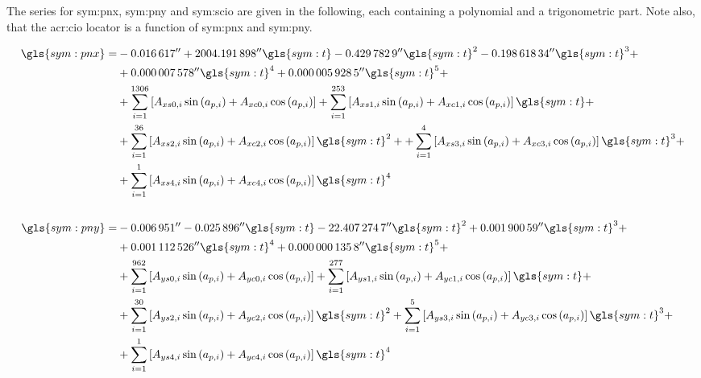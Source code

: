 The series for \gls{sym:pnx}, \gls{sym:pny} and \gls{sym:scio} are given in the following, each containing a polynomial and a trigonometric part. Note also, that the \gls{acr:cio} 
locator is a function of \gls{sym:pnx} and \gls{sym:pny}.

\begin{align}
\gls{sym:pnx} = &\ang{;;-0.016617} + \ang{;;2004.191898}\gls{sym:t} - \ang{;;0.4297829}\gls{sym:t}^2 - \ang{;;0.19861834}\gls{sym:t}^3 + \notag \\ 
                &+ \ang{;;0.000007578}\gls{sym:t}^4 + \ang{;;0.0000059285}\gls{sym:t}^5 + \notag \\
                &+ \sum_{i=1}^{1306}\left[A_{xs0,i} \sin\left(a_{p,i}\right) + A_{xc0,i} \cos\left(a_{p,i}\right)\right] + 
                   \sum_{i=1}^{253} \left[A_{xs1,i} \sin\left(a_{p,i}\right) + A_{xc1,i} \cos\left(a_{p,i}\right)\right]\gls{sym:t} + \label{eq:Xsum} \\
                &+ \sum_{i=1}^{36}  \left[A_{xs2,i} \sin\left(a_{p,i}\right) + A_{xc2,i} \cos\left(a_{p,i}\right)\right]\gls{sym:t}^2 +
                 + \sum_{i=1}^{4}   \left[A_{xs3,i} \sin\left(a_{p,i}\right) + A_{xc3,i} \cos\left(a_{p,i}\right)\right]\gls{sym:t}^3 +  \notag \\
                &+ \sum_{i=1}^{1}   \left[A_{xs4,i} \sin\left(a_{p,i}\right) + A_{xc4,i} \cos\left(a_{p,i}\right)\right]\gls{sym:t}^4  \notag \\
\notag \\
\gls{sym:pny} = & \ang{;;-0.006951} - \ang{;;0.025896}\gls{sym:t} - \ang{;;22.4072747}\gls{sym:t}^2 + \ang{;;0.00190059}\gls{sym:t}^3 + \notag \\
                    & + \ang{;;0.001112526}\gls{sym:t}^4 + \ang{;;0.0000001358}\gls{sym:t}^5 + \notag \\ 
                    & + \sum_{i=1}^{962}\left[A_{ys0,i} \sin\left(a_{p,i}\right) + A_{yc0,i} \cos\left(a_{p,i}\right)\right] + 
                        \sum_{i=1}^{277}\left[A_{ys1,i} \sin\left(a_{p,i}\right) + A_{yc1,i} \cos\left(a_{p,i}\right)\right]\gls{sym:t} + \label{eq:Ysum}  \\
                    & + \sum_{i=1}^{30} \left[A_{ys2,i} \sin\left(a_{p,i}\right) + A_{yc2,i} \cos\left(a_{p,i}\right)\right]\gls{sym:t}^2
                      + \sum_{i=1}^{5}  \left[A_{ys3,i} \sin\left(a_{p,i}\right) + A_{yc3,i} \cos\left(a_{p,i}\right)\right]\gls{sym:t}^3 + \notag \\
                    & + \sum_{i=1}^{1}  \left[A_{ys4,i} \sin\left(a_{p,i}\right) + A_{yc4,i} \cos\left(a_{p,i}\right)\right]\gls{sym:t}^4 \notag \\

\end{align}
